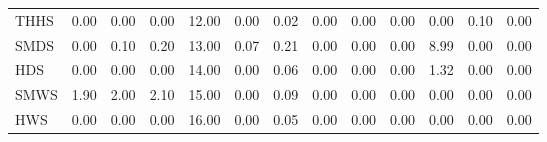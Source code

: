 \begin{table}[ht]
\begin{tabular}{lllllllllllll}
THHS  & 0.00  & 0.00    & 0.00  & 12.00 & 0.00  & 0.02 & 0.00 & 0.00  & 0.00 & 0.00 & 0.10 & 0.00 \\
SMDS  & 0.00  & 0.10    & 0.20  & 13.00 & 0.07  & 0.21 & 0.00 & 0.00  & 0.00 & 8.99 & 0.00 & 0.00 \\
HDS   & 0.00  & 0.00    & 0.00  & 14.00 & 0.00  & 0.06 & 0.00 & 0.00  & 0.00 & 1.32 & 0.00 & 0.00 \\
SMWS  & 1.90  & 2.00    & 2.10  & 15.00 & 0.00  & 0.09 & 0.00 & 0.00  & 0.00 & 0.00 & 0.00 & 0.00 \\
HWS   & 0.00  & 0.00    & 0.00  & 16.00 & 0.00  & 0.05 & 0.00 & 0.00  & 0.00 & 0.00 & 0.00 & 0.00
\end{tabular}
\hline
\vspace{1cm}
\pagebreak
\label{tab:CLIMEX Parameters Sensitivity}
\end{table}

